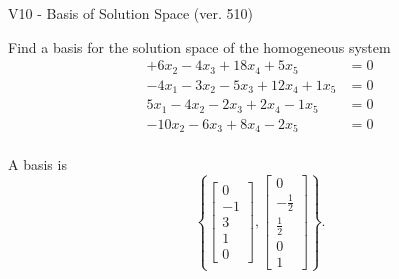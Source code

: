 \begin{exercise}
  \begin{exerciseTitle}V10 - Basis of Solution Space (ver. 510)\end{exerciseTitle}
  \begin{exerciseStatement}
    Find a basis for the solution space of the homogeneous system 
\begin{align*}
 + 6 x_ 2 -4 x_ 3 + 18 x_ 4 + 5 x_ 5 &= 0  \\ 
  -4 x_ 1 -3 x_ 2 -5 x_ 3 + 12 x_ 4 + 1 x_ 5 &= 0  \\ 
  5 x_ 1 -4 x_ 2 -2 x_ 3 + 2 x_ 4 -1 x_ 5 &= 0  \\ 
  -10 x_ 2 -6 x_ 3 + 8 x_ 4 -2 x_ 5 &= 0  \\ 
 \end{align*}


 
  \end{exerciseStatement}

  \begin{exerciseAnswer}
   A basis is   
\[\left\{\left[\begin{array}{c}
0 \\
-1 \\
3 \\
1 \\
0
\end{array}\right] , \left[\begin{array}{c}
0 \\
-\frac{1}{2} \\
\frac{1}{2} \\
0 \\
1
\end{array}\right]\right\}.\]

  


  \end{exerciseAnswer}
\end{exercise}